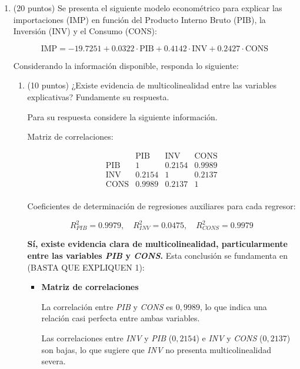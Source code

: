 \documentclass[10pt,a4paper]{article}
\begin{document}
\begin{enumerate}



\item (20 puntos) 
Se presenta el siguiente modelo econométrico para explicar las importaciones (IMP) en función del Producto Interno Bruto (PIB), la Inversión (INV) y el Consumo (CONS):

\[
\text{IMP} = -19.7251 + 0.0322 \cdot \text{PIB} + 0.4142 \cdot \text{INV} + 0.2427 \cdot \text{CONS}
\]

Considerando la información disponible, responda lo siguiente:

\begin{enumerate}
    \item (10 puntos) ¿Existe evidencia de multicolinealidad entre las variables explicativas? Fundamente su respuesta.

Para su respuesta considere la siguiente información.

    Matriz de correlaciones:

    \[
    \begin{array}{c|ccc}
    & \text{PIB} & \text{INV} & \text{CONS} \\
    \hline
    \text{PIB} & 1 & 0.2154 & 0.9989 \\
    \text{INV} & 0.2154 & 1 & 0.2137 \\
    \text{CONS} & 0.9989 & 0.2137 & 1 \\
    \end{array}
    \]

    Coeficientes de determinación de regresiones auxiliares para cada regresor:

    \[
    R_{PIB}^2 = 0.9979, \quad R_{INV}^2 = 0.0475, \quad R_{CONS}^2 = 0.9979
    \]

{\color{blue}
\textbf{Sí, existe evidencia clara de multicolinealidad, particularmente entre las variables \textit{PIB} y \textit{CONS}.} Esta conclusión se fundamenta en (BASTA QUE EXPLIQUEN 1):

\begin{itemize}
    \item \textbf{Matriz de correlaciones}

    La correlación entre \textit{PIB} y \textit{CONS} es $0{,}9989$, lo que indica una relación casi perfecta entre ambas variables.

    Las correlaciones entre \textit{INV} y \textit{PIB} ($0{,}2154$) e \textit{INV} y \textit{CONS} ($0{,}2137$) son bajas, lo que sugiere que \textit{INV} no presenta multicolinealidad severa.


\end{itemize}}
\end{enumerate}
\end{enumerate}
\end{document}
